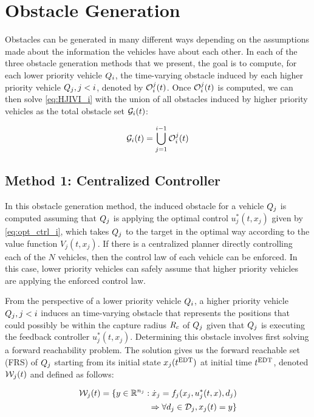 \section{Obstacle Generation \label{sec:obs_gen}}
Obstacles can be generated in many different ways depending on the assumptions made about the information the vehicles have about each other. In each of the three obstacle generation methods that we present, the goal is to compute, for each lower priority vehicle $Q_i$, the time-varying obstacle induced by each higher priority vehicle $Q_j, j < i$, denoted by $\mathcal{O}_i^j(t)$. Once $\mathcal{O}_i^j(t)$ is computed, we can then solve \eqref{eq:HJIVI_i} with the union of all obstacles induced by higher priority vehicles as the total obstacle set $\mathcal{G}_i(t)$:

\begin{equation}
\mathcal{G}_i(t) = \bigcup_{j=1}^{i-1}\mathcal{O}_i^j(t)
\end{equation}

\subsection{Method 1: Centralized Controller \label{sec:cc}}
In this obstacle generation method, the induced obstacle for a vehicle $Q_j$ is computed assuming that $Q_j$ is applying the optimal control $u_j^*(t, x_j)$ given by \eqref{eq:opt_ctrl_i}, which takes $Q_j$ to the target in the optimal way according to the value function $V_j(t, x_j)$. If there is a centralized planner directly controlling each of the $N$ vehicles, then the control law of each vehicle can be enforced. In this case, lower priority vehicles can safely assume that higher priority vehicles are applying the enforced control law. 

From the perspective of a lower priority vehicle $Q_i$, a higher priority vehicle $Q_j, j < i$ induces an time-varying obstacle that represents the positions that could possibly be within the capture radius $R_c$ of $Q_j$ given that $Q_j$ is executing the feedback controller $u_j^*(t, x_j)$. Determining this obstacle involves first solving a forward reachability problem. The solution gives us the forward reachable set (FRS) of $Q_j$ starting from its initial state $x_j(t^\text{EDT})$ at initial time $t^\text{EDT}$, denoted $\mathcal{W}_j(t)$ and defined as follows:

\begin{equation}
\label{eq:frs}
\begin{aligned}
\mathcal{W}_j(t) = \{y \in \mathbb{R}^{n_j}: \dot{x}_j = f_j(x_j, u_j^*(t, x), d_j) \\
\Rightarrow \forall d_j \in \mathcal{D}_j, x_j(t) = y\}
\end{aligned}
\end{equation}


